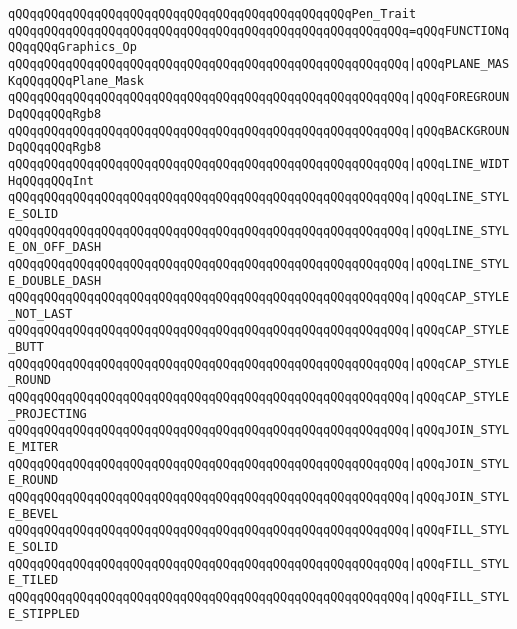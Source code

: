 \verb|qQQqqQQqqQQqqQQqqQQqqQQqqQQqqQQqqQQqqQQqqQQqqQQqPen_Trait|\newline
\verb|qQQqqQQqqQQqqQQqqQQqqQQqqQQqqQQqqQQqqQQqqQQqqQQqqQQqqQQq=qQQqFUNCTIONqQQqqQQqGraphics_Op|\newline
\verb|qQQqqQQqqQQqqQQqqQQqqQQqqQQqqQQqqQQqqQQqqQQqqQQqqQQqqQQq|\verb#|qQQqPLANE_MASKqQQqqQQqPlane_Mask#\newline
\verb|qQQqqQQqqQQqqQQqqQQqqQQqqQQqqQQqqQQqqQQqqQQqqQQqqQQqqQQq|\verb#|qQQqFOREGROUNDqQQqqQQqRgb8#\newline
\verb|qQQqqQQqqQQqqQQqqQQqqQQqqQQqqQQqqQQqqQQqqQQqqQQqqQQqqQQq|\verb#|qQQqBACKGROUNDqQQqqQQqRgb8#\newline
\verb|qQQqqQQqqQQqqQQqqQQqqQQqqQQqqQQqqQQqqQQqqQQqqQQqqQQqqQQq|\verb#|qQQqLINE_WIDTHqQQqqQQqInt#\newline
\verb|qQQqqQQqqQQqqQQqqQQqqQQqqQQqqQQqqQQqqQQqqQQqqQQqqQQqqQQq|\verb#|qQQqLINE_STYLE_SOLID#\newline
\verb|qQQqqQQqqQQqqQQqqQQqqQQqqQQqqQQqqQQqqQQqqQQqqQQqqQQqqQQq|\verb#|qQQqLINE_STYLE_ON_OFF_DASH#\newline
\verb|qQQqqQQqqQQqqQQqqQQqqQQqqQQqqQQqqQQqqQQqqQQqqQQqqQQqqQQq|\verb#|qQQqLINE_STYLE_DOUBLE_DASH#\newline
\verb|qQQqqQQqqQQqqQQqqQQqqQQqqQQqqQQqqQQqqQQqqQQqqQQqqQQqqQQq|\verb#|qQQqCAP_STYLE_NOT_LAST#\newline
\verb|qQQqqQQqqQQqqQQqqQQqqQQqqQQqqQQqqQQqqQQqqQQqqQQqqQQqqQQq|\verb#|qQQqCAP_STYLE_BUTT#\newline
\verb|qQQqqQQqqQQqqQQqqQQqqQQqqQQqqQQqqQQqqQQqqQQqqQQqqQQqqQQq|\verb#|qQQqCAP_STYLE_ROUND#\newline
\verb|qQQqqQQqqQQqqQQqqQQqqQQqqQQqqQQqqQQqqQQqqQQqqQQqqQQqqQQq|\verb#|qQQqCAP_STYLE_PROJECTING#\newline
\verb|qQQqqQQqqQQqqQQqqQQqqQQqqQQqqQQqqQQqqQQqqQQqqQQqqQQqqQQq|\verb#|qQQqJOIN_STYLE_MITER#\newline
\verb|qQQqqQQqqQQqqQQqqQQqqQQqqQQqqQQqqQQqqQQqqQQqqQQqqQQqqQQq|\verb#|qQQqJOIN_STYLE_ROUND#\newline
\verb|qQQqqQQqqQQqqQQqqQQqqQQqqQQqqQQqqQQqqQQqqQQqqQQqqQQqqQQq|\verb#|qQQqJOIN_STYLE_BEVEL#\newline
\verb|qQQqqQQqqQQqqQQqqQQqqQQqqQQqqQQqqQQqqQQqqQQqqQQqqQQqqQQq|\verb#|qQQqFILL_STYLE_SOLID#\newline
\verb|qQQqqQQqqQQqqQQqqQQqqQQqqQQqqQQqqQQqqQQqqQQqqQQqqQQqqQQq|\verb#|qQQqFILL_STYLE_TILED#\newline
\verb|qQQqqQQqqQQqqQQqqQQqqQQqqQQqqQQqqQQqqQQqqQQqqQQqqQQqqQQq|\verb#|qQQqFILL_STYLE_STIPPLED#\newline
